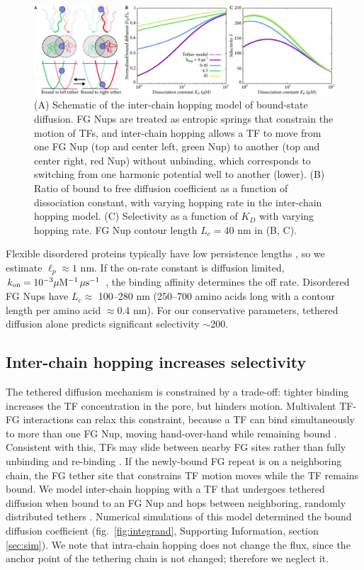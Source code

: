 \begin{figure}
\centering
\includegraphics[width = \textwidth]{figs/ch02/fig4.pdf}
\caption{(A) Schematic of the inter-chain hopping model of bound-state
  diffusion. FG Nups are treated as entropic springs that constrain
  the motion of TFs, and inter-chain hopping allows a TF to move from
  one FG Nup (top and center left, green Nup) to another (top and
  center right, red Nup) without unbinding, which corresponds to
  switching from one harmonic potential well to another (lower). (B)
  Ratio of bound to free diffusion coefficient as a function of
  dissociation constant, with varying hopping rate in the inter-chain
  hopping model.  (C) Selectivity as a function of $K_D$ with varying
  hopping rate. FG Nup contour length $L_c = 40$ nm in (B, C). }
\label{fig:hopping}
\end{figure}


Flexible disordered proteins typically have low persistence lengths \cite{receveur-brechot12}, so we estimate $\ell_p \approx 1$ nm.  If the on-rate constant is diffusion limited, $k_{\rm on} = 10^{-3}\mu \mathrm{M}^{-1} \, \mu \mathrm{s}^{-1}$ \cite{milles15, hough15}, the binding affinity determines the off rate.  Disordered FG Nups have $L_c\approx$ 100--280 nm (250--700 amino acids long \cite{patel07} with a contour length per amino acid $\approx 0.4$ nm). For our conservative parameters, tethered diffusion alone predicts significant selectivity $\sim$200.

\subsection{Inter-chain hopping increases selectivity}
The tethered diffusion mechanism is constrained by a trade-off:
tighter binding increases the TF concentration in the pore, but
hinders motion.  Multivalent TF-FG interactions can relax this
constraint, because a TF can bind simultaneously to more than one FG
Nup, moving hand-over-hand while remaining bound
\cite{tetenbaum-novatt12}. Consistent with this, TFs may slide between
nearby FG sites rather than fully unbinding and re-binding
\cite{raveh16}. If the newly-bound FG repeat is on a neighboring
chain, the FG tether site that constrains TF motion moves while the TF
remains bound.  We model inter-chain hopping with a TF that undergoes
tethered diffusion when bound to an FG Nup and hops between
neighboring, randomly distributed tethers .
Numerical simulations of this model determined the bound diffusion
coefficient (fig.~\ref{fig:integrand}, Supporting Information, section
\ref{sec:sim}). We note that intra-chain hopping does not change the
flux, since the anchor point of the tethering chain is not changed;
therefore we neglect it.

